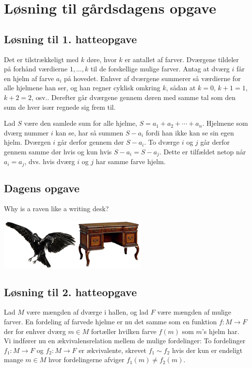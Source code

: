 \begin{minipage}[t]{100mm}
\vspace{3mm}
\section*{Løsning til gårdsdagens opgave}
\subsection*{Løsning til 1. hatteopgave}
Det er tilstrækkeligt med $k$ døre, hvor $k$ er antallet af farver. Dværgene tildeler på forhånd værdierne $1,\dotsc,k$ til de forskellige mulige farver. Antag at dværg $i$ får en hjelm af farve $a_i$ på hovedet. Enhver af dværgene summerer så værdierne for alle hjelmene han ser, og han regner cyklisk omkring $k$, sådan at $k=0$, $k+1=1$, $k+2=2$, osv.. Derefter går dværgene gennem døren med samme tal som den sum de hver især regnede sig frem til.

Lad $S$ være den samlede sum for alle hjelme, $S=a_1+a_2+\dotsb+a_n$. Hjelmene som dværg nummer $i$ kan se, har så summen $S-a_i$ fordi han ikke kan se sin egen hjelm. Dværgen $i$ går derfor gennem dør $S-a_i$. To dværge $i$ og $j$ går derfor gennem samme dør hvis og kun hvis $S-a_i=S-a_j$. Dette er tilfældet netop når $a_i=a_j$, dvs. hvis dværg $i$ og $j$ har samme farve hjelm.

\vspace{-4mm}
\begin{center}
\section*{Dagens opgave}
Why is a raven like a writing desk?
\end{center}
\includegraphics[width=\linewidth]{raven_and_desk.jpg}

\subsection*{Løsning til 2. hatteopgave}
Lad $M$ være mængden af dværge i hallen, og lad $F$ være mængden af mulige farver. En fordeling af farvede hjelme er nu det samme som en funktion $f\colon M\to F$ der for enhver dværg $m\in M$ fortæller hvilken farve $f(m)$ som $m$'s hjelm har. Vi indfører nu en ækvivalensrelation mellem de mulige fordelinger: To fordelinger $f_1\colon M\to F$ og $f_2\colon M\to F$ er ækvivalente, skrevet $f_1\sim f_2$ hvis der kun er endeligt mange $m\in M$ hvor fordelingerne afviger $f_1(m)\neq f_2(m)$.


\end{minipage}
